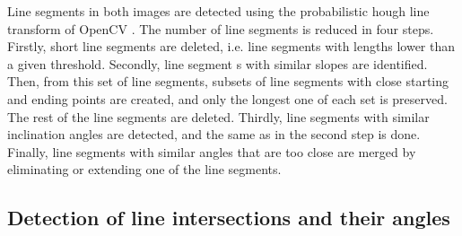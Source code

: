             Line segments in both images are detected using the probabilistic hough line transform of OpenCV \cite{opencv_library}.
            The number of line segments is reduced in four steps. 
            Firstly, short line segments are deleted, i.e. line segments with lengths lower than a given threshold.
            Secondly, line segment s with similar slopes are identified. 
            Then, from this set of line segments, subsets of line segments with close starting and ending points are created,
            and only the longest one of each set is preserved. The rest of the line segments are deleted.
            Thirdly, line segments with similar inclination angles are detected, and the same as in the second step is done.
            Finally, line segments with similar angles that are too close are merged by eliminating or extending one of the line segments.

        \subsection{Detection of line intersections and their angles}

